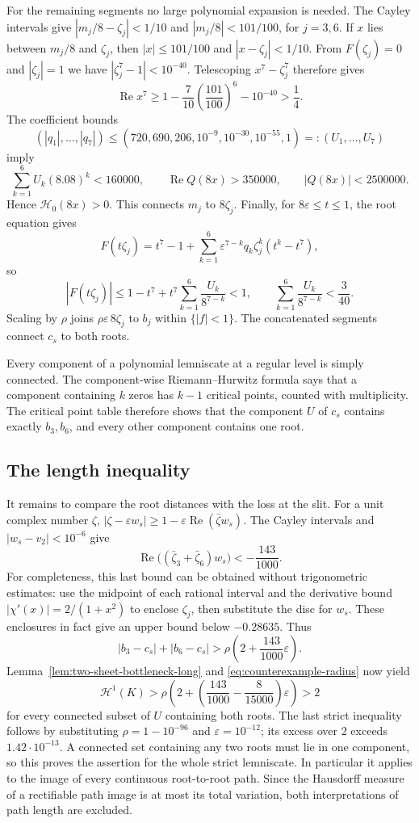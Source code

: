 \documentclass[11pt]{article}
\begin{document}
For the remaining segments no large polynomial expansion is needed.
The Cayley intervals give
$|m_j/8-\zeta_j|<1/10$ and $|m_j/8|<101/100$, for $j=3,6$.
If $x$ lies between $m_j/8$ and $\zeta_j$, then
$|x|\le101/100$ and $|x-\zeta_j|<1/10$.
From $F(\zeta_j)=0$ and $|\zeta_j|=1$ we have
$|\zeta_j^7-1|<10^{-40}$. Telescoping $x^7-\zeta_j^7$ therefore gives
\[
 \operatorname{Re}x^7
 \ge1-\frac7{10}\left(\frac{101}{100}\right)^6-10^{-40}>\frac14.
\]
The coefficient bounds
\[
 (|q_1|,\ldots,|q_7|)
 \le(720,690,206,10^{-9},10^{-30},10^{-55},1)=:(U_1,\ldots,U_7)
\]
imply
\[
 \sum_{k=1}^6U_k(8.08)^k<160000,\qquad
 \operatorname{Re}Q(8x)>350000,\qquad |Q(8x)|<2500000.
\]
Hence $\mathscr H_0(8x)>0$. This connects $m_j$ to $8\zeta_j$.
Finally, for $8\varepsilon\le t\le1$, the root equation gives
\[
 F(t\zeta_j)=t^7-1+
       \sum_{k=1}^6\varepsilon^{7-k}q_k\zeta_j^k(t^k-t^7),
\]
so
\[
 |F(t\zeta_j)|\le1-t^7+t^7\sum_{k=1}^6\frac{U_k}{8^{7-k}}<1,
 \qquad \sum_{k=1}^6\frac{U_k}{8^{7-k}}<\frac{3}{40}.
\]
Scaling by $\rho$ joins $\rho\varepsilon\,8\zeta_j$ to $b_j$ within
$\{|f|<1\}$. The concatenated segments connect $c_s$ to both roots.

Every component of a polynomial lemniscate at a regular level is simply
connected. The component-wise Riemann--Hurwitz formula
\cite[proof of Proposition~2.1]{eks2010} says that a component containing
$k$ zeros has $k-1$ critical points, counted with multiplicity. The critical
point table therefore shows that the component $U$ of $c_s$ contains
exactly $b_3,b_6$, and every other component contains one root.

\subsection{The length inequality}\label{subsec:counterexample-length}

It remains to compare the root distances with the loss at the slit.
For a unit complex number $\zeta$,
$|\zeta-\varepsilon w_s|\ge1-\varepsilon\operatorname{Re}(\bar\zeta w_s)$.
The Cayley intervals and $|w_s-v_2|<10^{-6}$ give
\[
 \operatorname{Re}\bigl((\bar\zeta_3+\bar\zeta_6)w_s\bigr)
 <-\frac{143}{1000}.
\]
For completeness, this last bound can be obtained without trigonometric
estimates: use the midpoint of each rational interval and the derivative
bound $|\chi'(x)|=2/(1+x^2)$ to enclose $\zeta_j$, then substitute the
disc for $w_s$. These enclosures in fact give an upper bound below
$-0.28635$. Thus
\[
 |b_3-c_s|+|b_6-c_s|>\rho\left(2+\frac{143}{1000}\varepsilon\right).
\]
Lemma~\ref{lem:two-sheet-bottleneck-long} and
\eqref{eq:counterexample-radius} now yield
\[
 \mathcal H^1(K)>
 \rho\left(2+\left(\frac{143}{1000}-\frac8{15000}\right)
                     \varepsilon\right)>2
\]
for every connected subset of $U$ containing both roots. The last strict
inequality follows by substituting $\rho=1-10^{-96}$ and
$\varepsilon=10^{-12}$; its excess over $2$ exceeds $1.42\cdot10^{-13}$.
A connected set containing any two roots must lie in one component, so
this proves the assertion for the whole strict lemniscate. In particular
it applies to the image of every continuous root-to-root path. Since the
Hausdorff measure of a rectifiable path image is at most its total
variation, both interpretations of path length are excluded.
\end{document}
